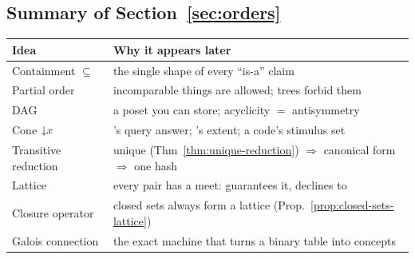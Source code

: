\subsection{Summary of Section~\ref{sec:orders}}

\begin{center}
\small
\begin{tabularx}{\textwidth}{lX}
\toprule
\textbf{Idea} & \textbf{Why it appears later}\\
\midrule
Containment $\subseteq$ & the single shape of every ``is-a'' claim\\
Partial order & incomparable things are allowed; trees forbid them\\
DAG & a poset you can store; acyclicity $=$ antisymmetry\\
Cone $\mathord{\downarrow}x$ & \odag{}'s query answer; \fca{}'s extent; a code's stimulus set\\
Transitive reduction & unique (Thm~\ref{thm:unique-reduction}) $\Rightarrow$ canonical form $\Rightarrow$ one hash\\
Lattice & every pair has a meet: \fca{} guarantees it, \odag{} declines to\\
Closure operator & closed sets always form a lattice (Prop.~\ref{prop:closed-sets-lattice})\\
Galois connection & the exact machine that turns a binary table into concepts\\
\bottomrule
\end{tabularx}
\end{center}
